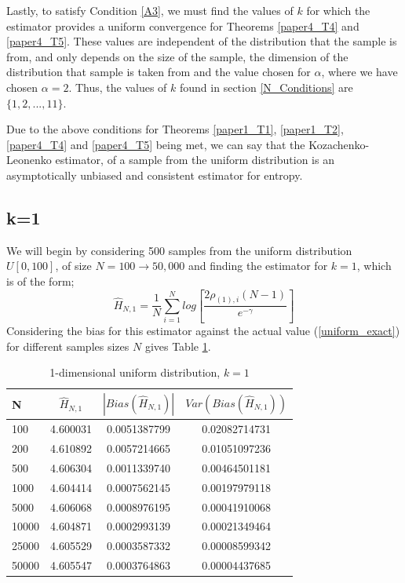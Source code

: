 \documentclass{report}
\begin{document}
Lastly, to satisfy Condition \ref{A3}, we must find the values of $k$ for which the estimator provides a uniform convergence for Theorems \ref{paper4_T4} and \ref{paper4_T5}. These values are independent of the distribution that the sample is from, and only depends on the size of the sample, the dimension of the distribution that sample is taken from and the value chosen for $\alpha$, where we have chosen $\alpha = 2$. Thus, the values of $k$ found in section \ref{N_Conditions} are $\{1, 2, ..., 11\}$.

Due to the above conditions for Theorems \ref{paper1_T1}, \ref{paper1_T2}, \ref{paper4_T4} and \ref{paper4_T5} being met, we can say that the Kozachenko-Leonenko estimator, of a sample from the uniform distribution is an asymptotically unbiased and consistent estimator for entropy. 




\subsection{k=1} \label{U_k=1}
We will begin by considering 500 samples from the uniform distribution $U[0,100]$, of size $N=100 \to 50,000$ and finding the estimator for $k=1$, which is of the form;
\begin{equation} 
\hat{H}_{N, 1} = \frac{1}{N} \sum_{i=1}^{N} log \left[ \frac{2\rho_{(1),i} (N-1)}{e^{-\gamma}} \right] \nonumber
\end{equation}
Considering the bias for this estimator against the actual value (\ref{uniform_exact}) for different samples sizes $N$ gives Table \ref{uniform_k=1_table}.

\begin{table}
\caption{1-dimensional uniform distribution, $k=1$} \label{uniform_k=1_table}
\begin{center}
\begin{tabular}{| l | c c c|} 
\toprule
N & $\hat{H}_{N, 1}$ & $|Bias(\hat{H}_{N, 1})|$ & $Var(Bias(\hat{H}_{N, 1}))$ \\
\midrule[1pt]
100     & 4.600031     & 0.0051387799     & 0.02082714731  \\
200     & 4.610892     & 0.0057214665     & 0.01051097236  \\
500     & 4.606304     & 0.0011339740     & 0.00464501181  \\
1000    & 4.604414     & 0.0007562145     & 0.00197979118  \\
5000    & 4.606068     & 0.0008976195     & 0.00041910068  \\
10000   & 4.604871     & 0.0002993139     & 0.00021349464  \\
25000   & 4.605529     & 0.0003587332     & 0.00008599342  \\
50000   & 4.605547     & 0.0003764863     & 0.00004437685  \\
\hline
\end{tabular}
\end{center}
\end{table}
\end{document}
